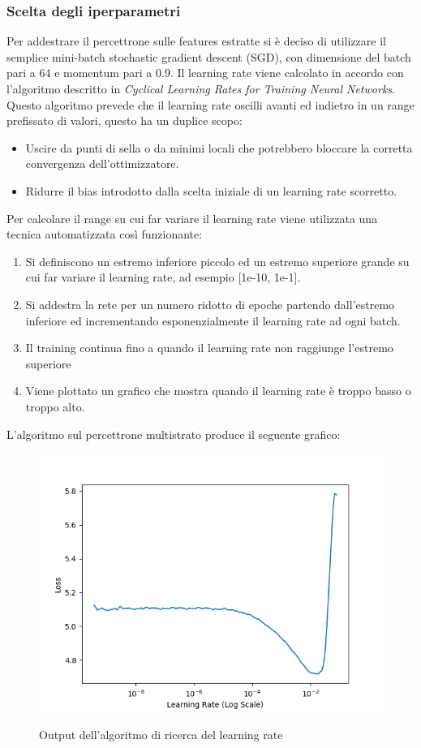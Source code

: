 \subsubsection{Scelta degli iperparametri}
Per addestrare il percettrone sulle features estratte si è deciso di utilizzare il semplice mini-batch stochastic gradient descent (SGD), con dimensione del batch pari a 64 e momentum pari a 0.9.
Il learning rate viene calcolato in accordo con l'algoritmo descritto in \textit{Cyclical Learning Rates for Training Neural Networks}.
Questo algoritmo prevede che il learning rate oscilli avanti ed indietro in un range prefissato di valori, questo ha un duplice scopo:
\begin{itemize}
\item Uscire da punti di sella o da minimi locali che potrebbero bloccare la corretta convergenza dell'ottimizzatore.
\item Ridurre il bias introdotto dalla scelta iniziale di un learning rate scorretto.
\end{itemize}
Per calcolare il range su cui far variare il learning rate viene utilizzata una tecnica automatizzata così funzionante:
\begin{enumerate}
\item Si definiscono un estremo inferiore piccolo ed un estremo superiore grande su cui far variare il learning rate, ad esempio [1e-10, 1e-1].
\item Si addestra la rete per un numero ridotto di epoche partendo dall'estremo inferiore ed incrementando esponenzialmente il learning rate ad ogni batch.
\item Il training continua fino a quando il learning rate non raggiunge l'estremo superiore
\item Viene plottato un grafico che mostra quando il learning rate è troppo basso o troppo alto.
\end{enumerate} 
L'algoritmo sul percettrone multistrato produce il seguente grafico:
\begin{figure}[ht]
\centering
\includegraphics[width=1.0\textwidth]{images/baseline/lrfind_plot.png} 
\label{i_baseline_finder}
\caption{Output dell'algoritmo di ricerca del learning rate}
\end{figure}
